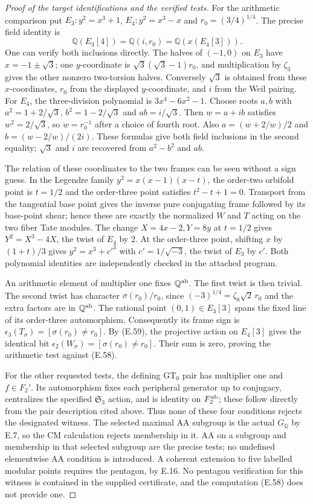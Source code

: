 \begin{proof}[Proof of the target identifications and the verified tests]
For the arithmetic comparison put
$E_3:y^2=x^3+1$, $E_4:y^2=x^3-x$ and
$r_0=(3/4)^{1/4}$.  The precise field identity is
\[
       \mathbb Q(E_3[4])=\mathbb Q(i,r_0)
                       =\mathbb Q(x(E_4[3])).             \tag{E.59}
\]
One can verify both inclusions directly.  The halves
of $(-1,0)$ on $E_3$ have $x=-1\pm\sqrt3$;
one $y$-coordinate is
$\sqrt3(\sqrt3-1)r_0$, and multiplication by
$\zeta_3$ gives the other nonzero two-torsion halves.
Conversely $\sqrt3$ is obtained from these
$x$-coordinates, $r_0$ from the displayed
$y$-coordinate, and $i$ from the Weil pairing.
For $E_4$, the three-division polynomial is
$3x^4-6x^2-1$.  Choose roots $a,b$ with
$a^2=1+2/\sqrt3$, $b^2=1-2/\sqrt3$ and
$ab=i/\sqrt3$.  Then $w=a+ib$ satisfies
$w^2=2/\sqrt3$, so $w=r_0^{-1}$ after a choice
of fourth root.  Also
$a=(w+2/w)/2$ and $b=(w-2/w)/(2i)$.
These formulas give both field inclusions in the
second equality; $\sqrt3$ and $i$ are recovered
from $a^2-b^2$ and $ab$.

The relation of these coordinates to the two frames
can be seen without a sign guess.  In the Legendre
family $y^2=x(x-1)(x-t)$, the order-two orbifold
point is $t=1/2$ and the order-three point satisfies
$t^2-t+1=0$.  Transport from the tangential base
point gives the inverse pure conjugating frame
followed by its base-point shear; hence these are
exactly the normalized $W$ and $T$ acting on the
two fiber Tate modules.  The change
$X=4x-2,Y=8y$ at $t=1/2$ gives
$Y^2=X^3-4X$, the twist of $E_4$ by $2$.
At the order-three point, shifting $x$ by
$(1+t)/3$ gives $y^2=x^3+c'^3$ with
$c'=1/\sqrt{-3}$, the twist of $E_3$ by $c'$.
Both polynomial identities are independently
checked in the attached program.

An arithmetic element of multiplier one fixes
$\mathbb Q^{\rm ab}$.  The first twist is then
trivial.  The second twist has character
$\sigma(r_0)/r_0$, since
$(-3)^{1/4}=\zeta_8\sqrt2\,r_0$ and the extra
factors are in $\mathbb Q^{\rm ab}$.
The rational point $(0,1)\in E_3[3]$ spans the
fixed line of its order-three automorphism.
Consequently its frame sign is
$\epsilon_3(T_\sigma)=[\sigma(r_0)\ne r_0]$.
By (E.59), the projective action on $E_4[3]$
gives the identical bit
$\epsilon_2(W_\sigma)=[\sigma(r_0)\ne r_0]$.
Their sum is zero, proving the arithmetic test
against (E.58).

For the other requested tests, the defining
GT$_0$ pair has multiplier one and $f\in F_2'$.
Its automorphism fixes each peripheral generator
up to conjugacy, centralizes the specified
$\mathfrak S_3$ action, and is identity on
$F_2^{\rm ab}$; these follow directly from the
pair description cited above.  Thus none of these
four conditions rejects the designated witness.
The selected maximal AA subgroup is the actual
$G_{\mathbb Q}$ by E.7, so the CM calculation
rejects membership in it.  AA on a subgroup and
membership in that selected subgroup are the
precise tests; no undefined elementwise AA
condition is introduced.  A coherent extension
to five labelled modular points requires the
pentagon, by E.16.  No pentagon verification for
this witness is contained in the supplied
certificate, and the computation (E.58) does not
provide one.


\end{proof}
